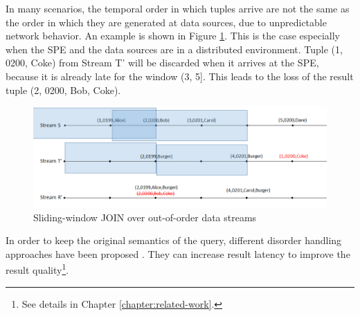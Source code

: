 \documentclass[a4paper, 11pt, twoside]{report}
\begin{document}
In many scenarios, the temporal order in which tuples arrive are not the same as the order in which they are generated at data sources, due to unpredictable network behavior. An example is shown in Figure \ref{fig:intro-example-ooo}. This is the case especially when the SPE and the data sources are in a distributed environment. Tuple (1, 0200, Coke) from Stream T' will be discarded when it arrives at the SPE, because it is already late for the window (3, 5]. This leads to the loss of the result tuple (2, 0200, Bob, Coke).\\

\begin{figure}[h]
\centering
\includegraphics[width=5in]{intro-example-ooo}
\caption{Sliding-window JOIN over out-of-order data streams \label{fig:intro-example-ooo}}
\end{figure}

In order to keep the original semantics of the query, different disorder handling approaches have been proposed \cite{Babu:2004:EKC:1016028.1016032}\cite{barga2006consistent}\cite{Srivastava:2004:FTM:1055558.1055596}. They can increase result latency to improve the result quality\footnote{See details in Chapter \ref{chapter:related-work}.}.\\
\end{document}

